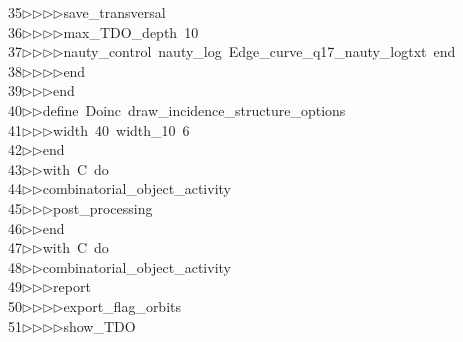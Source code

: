 \begin{tabbing}
35\>$\triangleright$\>$\triangleright$\>$\triangleright$\>$\triangleright$\>save\_transversal\ \\[0pt]
36\>$\triangleright$\>$\triangleright$\>$\triangleright$\>$\triangleright$\>max\_TDO\_depth\ 10\ \\[0pt]
37\>$\triangleright$\>$\triangleright$\>$\triangleright$\>$\triangleright$\>nauty\_control\ nauty\_log\ Edge\_curve\_q17\_nauty\_logtxt\ end\ \\[0pt]
38\>$\triangleright$\>$\triangleright$\>$\triangleright$\>$\triangleright$\>end\ \\[0pt]
39\>$\triangleright$\>$\triangleright$\>$\triangleright$\>end\ \\[0pt]
40\>$\triangleright$\>$\triangleright$\>define\ Doinc\ draw\_incidence\_structure\_options\ \\[0pt]
41\>$\triangleright$\>$\triangleright$\>$\triangleright$\>width\ 40\ width\_10\ 6\ \\[0pt]
42\>$\triangleright$\>$\triangleright$\>end\ \\[0pt]
43\>$\triangleright$\>$\triangleright$\>with\ C\ do\ \\[0pt]
44\>$\triangleright$\>$\triangleright$\>combinatorial\_object\_activity\ \\[0pt]
45\>$\triangleright$\>$\triangleright$\>$\triangleright$\>post\_processing\ \\[0pt]
46\>$\triangleright$\>$\triangleright$\>end\ \\[0pt]
47\>$\triangleright$\>$\triangleright$\>with\ C\ do\ \\[0pt]
48\>$\triangleright$\>$\triangleright$\>combinatorial\_object\_activity\ \\[0pt]
49\>$\triangleright$\>$\triangleright$\>$\triangleright$\>report\ \\[0pt]
50\>$\triangleright$\>$\triangleright$\>$\triangleright$\>$\triangleright$\>export\_flag\_orbits\ \\[0pt]
51\>$\triangleright$\>$\triangleright$\>$\triangleright$\>$\triangleright$\>show\_TDO\ \\[0pt]

\end{tabbing}
